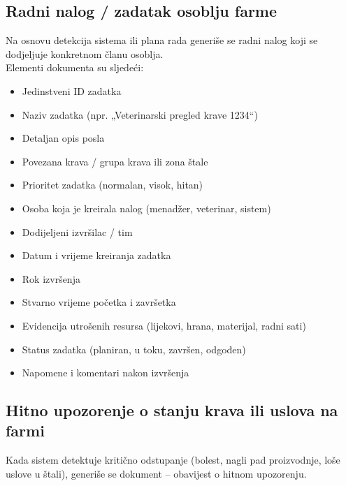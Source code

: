\documentclass{article}
\begin{document}
\newpage

\subsection*{Radni nalog / zadatak osoblju farme}
Na osnovu detekcija sistema ili plana rada generiše se radni nalog koji se dodjeljuje konkretnom članu osoblja. \\

\noindent Elementi dokumenta su sljedeći:
\begin{itemize}
    \item Jedinstveni ID zadatka
    \item Naziv zadatka (npr. „Veterinarski pregled krave 1234“)
    \item Detaljan opis posla
    \item Povezana krava / grupa krava ili zona štale
    \item Prioritet zadatka (normalan, visok, hitan)
    \item Osoba koja je kreirala nalog (menadžer, veterinar, sistem)
    \item Dodijeljeni izvršilac / tim
    \item Datum i vrijeme kreiranja zadatka
    \item Rok izvršenja
    \item Stvarno vrijeme početka i završetka
    \item Evidencija utrošenih resursa (lijekovi, hrana, materijal, radni sati)
    \item Status zadatka (planiran, u toku, završen, odgođen)
    \item Napomene i komentari nakon izvršenja
\end{itemize}

\subsection*{Hitno upozorenje o stanju krava ili uslova na farmi}
Kada sistem detektuje kritično odstupanje (bolest, nagli pad proizvodnje, loše uslove u štali), generiše se dokument – obavijest o hitnom upozorenju. \\
\end{document}
